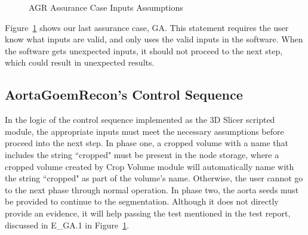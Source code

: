 \begin{figure}[H]
    \centering
    \caption[AGR Assurance Case Inputs Assumptions]{AGR Assurance Case Inputs Assumptions}
    \label{fig_agr_ac_ga}
\end{figure}

Figure~\ref{fig_agr_ac_ga} shows our last assurance case, GA. This statement requires the user know what inputs are valid, and only uses the valid inputs in the software. When the software gets unexpected inputs, it should not proceed to the next step, which could result in unexpected results.

\subsection{AortaGoemRecon's Control Sequence}

In the logic of the control sequence implemented as the 3D Slicer scripted module, the appropriate inputs must meet the necessary assumptions before proceed into the next step.
In phase one, a cropped volume with a name that includes the string ``cropped" must be present in the node storage, where a cropped volume created by Crop Volume module will automatically name with the string ``cropped" as part of the volume's name. Otherwise, the user cannot go to the next phase through normal operation. In phase two, the aorta seeds must be provided to continue to the segmentation. Although it does not directly provide an evidence, it will help passing the test mentioned in the test report, discussed in E\_GA.1 in Figure~\ref{fig_agr_ac_ga}.

